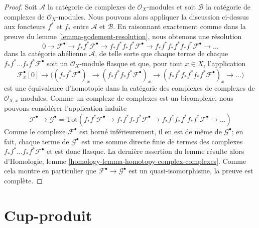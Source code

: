 {\begin{proof}

Soit $\mathcal{A}$ la catégorie de complexes de $\mathcal{O}_X$-modules et soit $\mathcal{B}$ la catégorie de complexes de $\mathcal{O}_X$-modules. Nous pouvons alors appliquer la discussion ci-dessus aux foncteurs
$f^*$ et $f_*$ entre $\mathcal{A}$ et $\mathcal{B}$. En raisonnant exactement comme dans la preuve du lemme \ref{lemma-godement-resolution},
nous obtenons une résolution
$$
0 \to
\mathcal{F}^\bullet \to
f_*f^*\mathcal{F}^\bullet \to
f_*f^*f_*f^*\mathcal{F}^\bullet \to
f_*f^*f_*f^*f_*f^*\mathcal{F}^\bullet \to \ldots
$$
dans la catégorie abélienne $\mathcal{A}$, de telle sorte que chaque terme de chaque
$f_*f^*\ldots f_*f^*\mathcal{F}^\bullet$ soit un
$\mathcal{O}_X$-module flasque et que, pour tout $x \in X$, l'application
$$
\mathcal{F}^\bullet_x[0] \to \Big(
(f_*f^*\mathcal{F}^\bullet)_x \to
(f_*f^*f_*f^*\mathcal{F}^\bullet)_x \to
(f_*f^*f_*f^*f_*f^*\mathcal{F}^\bullet)_x \to \ldots
\Big)
$$
est une équivalence d'homotopie dans la catégorie des complexes de complexes de $\mathcal{O}_{X, x}$-modules. Comme un complexe de complexes est un bicomplexe, nous pouvons considérer l'application induite
$$
\mathcal{F}^\bullet \to
\mathcal{G}^\bullet =
\text{Tot}(
f_*f^*\mathcal{F}^\bullet \to
f_*f^*f_*f^*\mathcal{F}^\bullet \to
f_*f^*f_*f^*f_*f^*\mathcal{F}^\bullet \to \ldots
)
$$
Comme le complexe $\mathcal{F}^\bullet$ est borné inférieurement, il en est de même de $\mathcal{G}^\bullet$; en fait, chaque terme de $\mathcal{G}^\bullet$ est une somme directe finie de termes des complexes $f_*f^*\ldots f_*f^*\mathcal{F}^\bullet$
et est donc flasque. La dernière assertion du lemme résulte alors d'Homologie, lemme \ref{homology-lemma-homotopy-complex-complexes}. Comme cela montre en particulier que
$\mathcal{F}^\bullet \to \mathcal{G}^\bullet$
est un quasi-isomorphisme, la preuve est complète.

\end{proof}
\section{Cup-produit}

\label{section-cup-product}

\noindent

}
